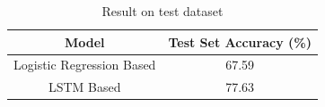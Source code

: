\documentclass[10pt,a4paper]{article}
\begin{document}
\begin{table}[h!]
\centering
\begin{tabular}{|c| c|} 
 \hline
 Model & Test Set Accuracy (\%) \\
 \hline\hline
Logistic Regression Based & 67.59 \\ 
 \hline
LSTM Based & 77.63 \\ 
 \hline

\end{tabular}
\caption{Result on test dataset }
\label{table:3}
\end{table}




\end{document}
